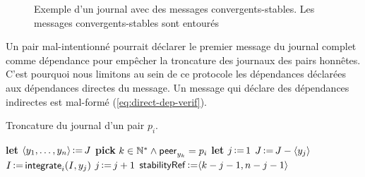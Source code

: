 \begin{figure}[hbt]
\centering
{}
\caption[Exemple d'un journal avec des messages convergents-stables]{Exemple d'un journal avec des messages convergents-stables.
Les messages convergents-stables sont entourés}\label{fig:log-stability-example-b}
\end{figure}

Un pair mal-intentionné pourrait déclarer le premier message du journal complet comme dépendance pour empêcher la troncature des journaux des pairs honnêtes.
C'est pourquoi nous limitons au sein de ce protocole les dépendances déclarées aux dépendances directes du message.
Un message qui déclare des dépendances indirectes est mal-formé (\autoref{eq:direct-dep-verif}).

\begin{algorithm}[ht]
\caption{Troncature du journal d'un pair $p_i$.}\label{alg:log-truncation}
\begin{algorithmic}[1]
    \State \textbf{let} $\tuple*{y_1, \dotsc, y_n} \assign J$
    \State \textbf{pick} $k \in \mathbb{N}^* \land \trm{peer}_{y_k} = p_i$
        \State \textbf{let} $j \assign 1$
            \State $J \assign J \sminus \tuple*{y_j}$ 
            \State $I \assign \trm{integrate}_i(I, y_j)$ 
            \State $j \assign j + 1$ 
        \EndWhile
        \State $\trm{stabilityRef} \assign \tuple*{k - j - 1, n - j - 1}$ 
    \EndIf
\EndProcedure
\end{algorithmic}
\end{algorithm}


